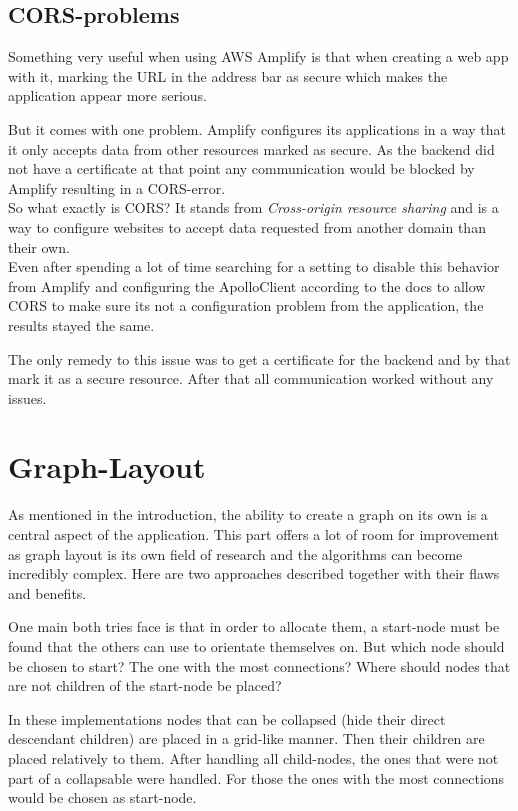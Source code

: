 \subsection{CORS-problems}
Something very useful when using AWS Amplify is that when creating a web app with it, marking the URL in the address bar as secure which makes the application appear more serious.

But it comes with one problem. Amplify configures its applications in a way that it only accepts data from other resources marked as secure. As the backend did not have a certificate at that point any communication would be blocked by Amplify resulting in a CORS-error. \\

So what exactly is CORS? It stands from \emph{Cross-origin resource sharing} and is a way to configure websites to accept data requested from another domain than their own. \\

Even after spending a lot of time searching for a setting to disable this behavior from Amplify and configuring the ApolloClient according to the docs to allow CORS to make sure its not a configuration problem from the application, the results stayed the same.

The only remedy to this issue was to get a certificate for the backend and by that mark it as a secure resource. After that all communication worked without any issues.

\section{Graph-Layout}
As mentioned in the introduction, the ability to create a graph on its own is a central aspect of the application. This part offers a lot of room for improvement as graph layout is its own field of research and the algorithms can become incredibly complex. Here are two approaches described together with their flaws and benefits.

One main both tries face is that in order to allocate them, a start-node must be found that the others can use to orientate themselves on. But which node should be chosen to start? The one with the most connections? Where should nodes that are not children of the start-node be placed? 

In these implementations nodes that can be collapsed (hide their direct descendant children) are placed in a grid-like manner. Then their children are placed relatively to them. After handling all child-nodes, the ones that were not part of a collapsable were handled. For those the ones with the most connections would be chosen as start-node.

